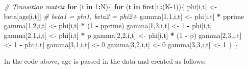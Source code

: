 \documentclass[
  12pt,
]{krantz}
\newenvironment{Shaded}{\begin{snugshade}}{\end{snugshade}}
\newcommand{\CommentTok}[1]{\textcolor[rgb]{0.56,0.35,0.01}{\textit{#1}}}
\newcommand{\ControlFlowTok}[1]{\textcolor[rgb]{0.13,0.29,0.53}{\textbf{#1}}}
\newcommand{\DecValTok}[1]{\textcolor[rgb]{0.00,0.00,0.81}{#1}}
\newcommand{\NormalTok}[1]{#1}
\newcommand{\OtherTok}[1]{\textcolor[rgb]{0.56,0.35,0.01}{#1}}
\newcommand{\SpecialCharTok}[1]{\textcolor[rgb]{0.81,0.36,0.00}{\textbf{#1}}}
\begin{document}
\begin{Shaded}
\begin{Highlighting}[]
\CommentTok{\# Transition matrix}
  \ControlFlowTok{for}\NormalTok{ (i }\ControlFlowTok{in} \DecValTok{1}\SpecialCharTok{:}\NormalTok{N)\{}
    \ControlFlowTok{for}\NormalTok{ (t }\ControlFlowTok{in}\NormalTok{ first[i]}\SpecialCharTok{:}\NormalTok{(K}\DecValTok{{-}1}\NormalTok{))\{}
\NormalTok{      phi[i,t] }\OtherTok{\textless{}{-}}\NormalTok{ beta[age[i,t]] }\CommentTok{\# beta1 = phi1, beta2 = phi2+}
\NormalTok{      gamma[}\DecValTok{1}\NormalTok{,}\DecValTok{1}\NormalTok{,i,t] }\OtherTok{\textless{}{-}}\NormalTok{ phi[i,t] }\SpecialCharTok{*}\NormalTok{ pprime}
\NormalTok{      gamma[}\DecValTok{1}\NormalTok{,}\DecValTok{2}\NormalTok{,i,t] }\OtherTok{\textless{}{-}}\NormalTok{ phi[i,t] }\SpecialCharTok{*}\NormalTok{ (}\DecValTok{1} \SpecialCharTok{{-}}\NormalTok{ pprime)}
\NormalTok{      gamma[}\DecValTok{1}\NormalTok{,}\DecValTok{3}\NormalTok{,i,t] }\OtherTok{\textless{}{-}} \DecValTok{1} \SpecialCharTok{{-}}\NormalTok{ phi[i,t]}
\NormalTok{      gamma[}\DecValTok{2}\NormalTok{,}\DecValTok{1}\NormalTok{,i,t] }\OtherTok{\textless{}{-}}\NormalTok{ phi[i,t] }\SpecialCharTok{*}\NormalTok{ p}
\NormalTok{      gamma[}\DecValTok{2}\NormalTok{,}\DecValTok{2}\NormalTok{,i,t] }\OtherTok{\textless{}{-}}\NormalTok{ phi[i,t] }\SpecialCharTok{*}\NormalTok{ (}\DecValTok{1} \SpecialCharTok{{-}}\NormalTok{ p)}
\NormalTok{      gamma[}\DecValTok{2}\NormalTok{,}\DecValTok{3}\NormalTok{,i,t] }\OtherTok{\textless{}{-}} \DecValTok{1} \SpecialCharTok{{-}}\NormalTok{ phi[i,t] }
\NormalTok{      gamma[}\DecValTok{3}\NormalTok{,}\DecValTok{1}\NormalTok{,i,t] }\OtherTok{\textless{}{-}} \DecValTok{0}
\NormalTok{      gamma[}\DecValTok{3}\NormalTok{,}\DecValTok{2}\NormalTok{,i,t] }\OtherTok{\textless{}{-}} \DecValTok{0} 
\NormalTok{      gamma[}\DecValTok{3}\NormalTok{,}\DecValTok{3}\NormalTok{,i,t] }\OtherTok{\textless{}{-}} \DecValTok{1}
\NormalTok{    \}}
\NormalTok{  \}}
\end{Highlighting}
\end{Shaded}

In the code above, age is passed in the data and created as follows:
\end{document}
